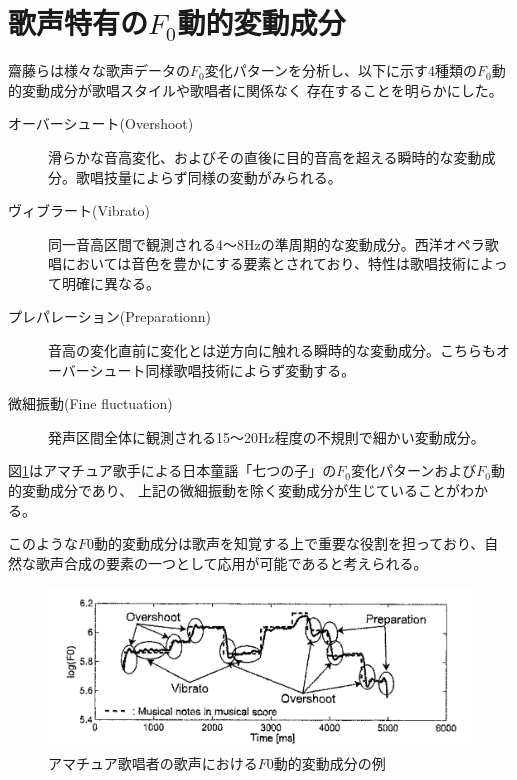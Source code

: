 \documentclass[10.5ptj,a4j,dvipdfmx,uplatex, oneside, openany, report]{jsbook}%
\begin{document}
\section{歌声特有の$F_0$動的変動成分}
齋藤らは様々な歌声データの$F_0$変化パターンを分析し、以下に示す4種類の$F_0$動的変動成分が歌唱スタイルや歌唱者に関係なく
存在することを明らかにした\cite{singbyspeaking}。
\begin{description}
    \item[オーバーシュート(Overshoot)]滑らかな音高変化、およびその直後に目的音高を超える瞬時的な変動成分。歌唱技量によらず同様の変動がみられる\cite{F0Cahara}。
    \item[ヴィブラート(Vibrato)]同一音高区間で観測される4〜8Hzの準周期的な変動成分。西洋オペラ歌唱においては音色を豊かにする要素とされており\cite{vibPercept}、特性は歌唱技術によって明確に異なる\cite{naturalVib}。
    \item[プレパレーション(Preparationn)]音高の変化直前に変化とは逆方向に触れる瞬時的な変動成分。こちらもオーバーシュート同様歌唱技術によらず変動する。
    \item[微細振動(Fine fluctuation)] 発声区間全体に観測される15〜20Hz程度の不規則で細かい変動成分。
\end{description}


図\ref{f0_moving}はアマチュア歌手による日本童謡「七つの子」の$F_0$変化パターンおよび$F_0$動的変動成分であり、
上記の微細振動を除く変動成分が生じていることがわかる。

このような$F0$動的変動成分は歌声を知覚する上で重要な役割を担っており、自然な歌声合成の要素の一つとして応用が可能であると考えられる。


\begin{figure}[htbp]
    \begin{center}
      \includegraphics[clip,width=12.0cm]{f0_moving.png}
      \caption{アマチュア歌唱者の歌声における$F0$動的変動成分の例\cite{singbyspeaking}}
      \label{f0_moving}
    \end{center}
\end{figure}
\end{document}
